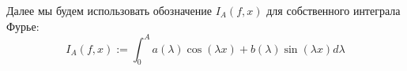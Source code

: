 \begin{note}
	Далее мы будем использовать обозначение $I_A(f, x)$ для собственного интеграла Фурье:
	\[
		I_A(f, x) := \int_0^A a(\lambda)\cos(\lambda x) + b(\lambda)\sin(\lambda x)d\lambda
	\]
\end{note}
